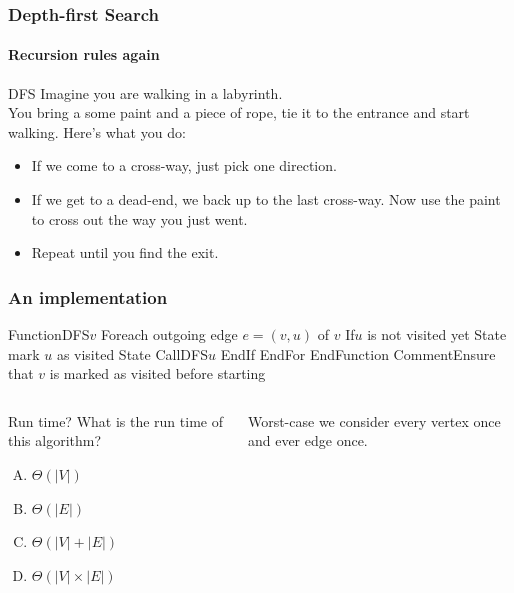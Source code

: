 \begin{frame}
	\frametitle{Depth-first Search}
	\framesubtitle{Recursion rules again}

		\begin{block}{DFS}
			Imagine you are walking in a labyrinth.\\
			\pause
			You bring a some paint and a piece of rope, tie it to the entrance and start walking. Here's what you do:\\
			\pause
			\begin{itemize}
				\item If we come to a cross-way, just pick one direction.
					\pause
				\item If we get to a dead-end, we back up to the last cross-way. Now use the paint to cross out the way you just
					went.
					\pause
				\item Repeat until you find the exit.
			\end{itemize}
		\end{block}	
	
\end{frame}

\begin{frame}
	\frametitle{An implementation}
	
	\begin{block}
		Function{DFS}{$v$}
	\pause
		For{each outgoing edge $e=(v,u)$ of $v$}
	\pause
		If{$u$ is not visited yet}
		State mark $u$ as visited
	\pause
		State Call{DFS}{$u$}
		EndIf
		EndFor
		EndFunction
		Comment{Ensure that $v$ is marked as visited before starting}
	\end{block}
	\pause
	\begin{columns}
		\column{0.455\textwidth}
	\begin{block}{Run time?}
		What is the run time of this algorithm?
		\begin{enumerate}[A.]
			\item $\Theta(|V|)$
			\item $\Theta(|E|)$
			\item $\Theta(|V| + |E|)$
			\item $\Theta(|V|\times|E|)$
		\end{enumerate}
	\end{block}
		\column{0.455\textwidth}
		\pause
		\begin{block}{}
			Worst-case we consider every vertex once and ever edge once.
		\end{block}
	\end{columns}
\end{frame}

